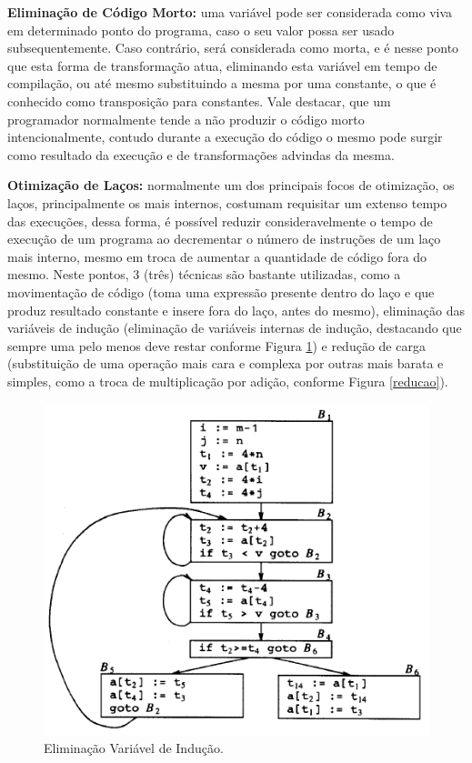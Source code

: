 \documentclass[12pt]{article}
\begin{document}
\textbf{Eliminação de Código Morto:} uma variável pode ser considerada como viva em determinado ponto do programa, caso o seu valor possa ser usado subsequentemente. Caso contrário, será considerada como morta, e é nesse ponto que esta forma de transformação atua, eliminando esta variável em tempo de compilação, ou até mesmo substituindo a mesma por uma constante, o que é conhecido como transposição para constantes. Vale destacar, que um programador normalmente tende a não produzir o código morto intencionalmente, contudo durante a execução do código o mesmo pode surgir como resultado da execução e de transformações advindas da mesma.

\textbf{Otimização de Laços:} normalmente um dos principais focos de otimização, os laços, principalmente os mais internos, costumam requisitar um extenso tempo das execuções, dessa forma, é possível reduzir consideravelmente o tempo de execução de um programa ao decrementar o número de instruções de um laço mais interno, mesmo em troca de aumentar a quantidade de código fora do mesmo. Neste pontos, 3 (três) técnicas são bastante utilizadas, como a movimentação de código (toma uma expressão presente dentro do laço e que produz resultado constante e insere fora do laço, antes do mesmo), eliminação das variáveis de indução (eliminação de variáveis internas de indução, destacando que sempre uma pelo menos deve restar conforme Figura \ref{eliminacao_inducao}) e redução de carga (substituição de uma operação mais cara e complexa por outras mais barata e simples, como a troca de multiplicação por adição, conforme Figura \ref{reducao}).

\begin{figure}[!htb]
    \centering
    \includegraphics[scale=0.9]{Imagens/eliminacao_variavel_inducao.png}
    \centering
    \caption{Eliminação Variável de Indução.}
    \label{eliminacao_inducao}
\end{figure}
\end{document}
